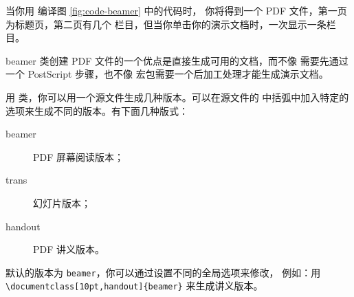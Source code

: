 当你用  编译图 \ref{fig:code-beamer} 中的代码时，
你将得到一个 PDF 文件，第一页为标题页，第二页有几个
栏目，但当你单击你的演示文档时，一次显示一条栏目。


beamer 类创建 PDF 文件的一个优点是直接生成可用的文档，而不像  需要先通过
一个 PostScript 步骤，也不像  宏包需要一个后加工处理才能生成演示文档。


用  类，你可以用一个源文件生成几种版本。可以在源文件的
中括弧中加入特定的选项来生成不同的版本。有下面几种版式：


\begin{description}
\item[beamer]  PDF 屏幕阅读版本；
\item[trans] 幻灯片版本；
\item[handout]  PDF 讲义版本。
\end{description}


默认的版本为 \texttt{beamer}，你可以通过设置不同的全局选项来修改，
例如：用 \verb|\documentclass[10pt,handout]{beamer}| 来生成讲义版本。


